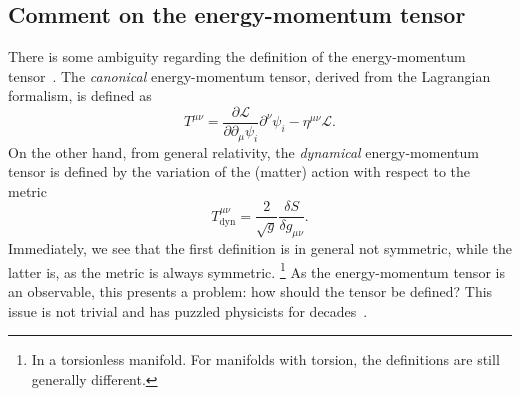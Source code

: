 \subsection{Comment on the energy-momentum tensor}\label{sec:commen-T}
There is some ambiguity regarding the definition of the energy-momentum tensor~\cites{kachelriessQuantumFieldsHubble2018}{chernodubThermalTransportGeometry2021}{vanderwurffMagnetovorticalThermoelectricTransport2019}{forgerCurrentsEnergyMomentumTensor2004}.
The \emph{canonical} energy-momentum tensor, derived from the Lagrangian formalism, is defined as
\begin{equation}
	T^{\mu \nu } = \frac{\partial \mathcal{L}}{\partial \partial _{\mu } \psi_i } \partial ^{\nu } \psi_i - \eta^{\mu \nu } \mathcal{L}.
\end{equation}
On the other hand, from general relativity, the \emph{dynamical} energy-momentum tensor is defined by the variation of the (matter) action with respect to the metric~\cite{kachelriessQuantumFieldsHubble2018}
\begin{equation}
	T_{\text{dyn}}^{\mu \nu} = \frac{2}{\sqrt{g} } \frac{\delta S}{\delta g_{\mu \nu}}.
\end{equation}
Immediately, we see that the first definition is in general not symmetric, while the latter is, as the metric is always symmetric.%
\footnote{In a torsionless manifold. For manifolds with torsion, the definitions are still generally different.}
As the energy-momentum tensor is an observable, this presents a problem:
how should the tensor be defined?
This issue is not trivial and has puzzled physicists for decades~\cite{forgerCurrentsEnergyMomentumTensor2004}.

